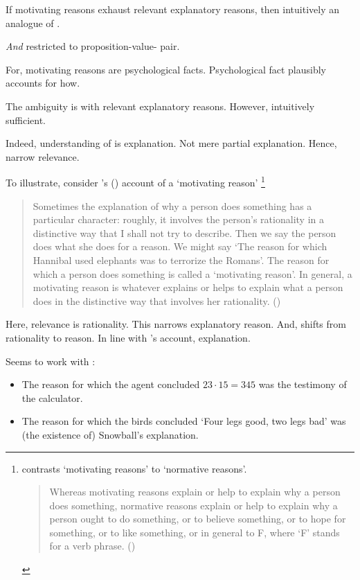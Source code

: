 \begin{note}
  If motivating reasons exhaust relevant explanatory reasons, then intuitively an analogue of \issueInclusion{}.

  {
    \color{red}
    \emph{And} restricted to proposition-value-\poP{} pair.
  }

  For, motivating reasons are psychological facts.
  Psychological fact plausibly accounts for how.

  The ambiguity is with relevant explanatory reasons.
  However, intuitively sufficient.

  Indeed, understanding of \citeauthor{Hieronymi:2011aa} is explanation.
  Not mere partial explanation.
  Hence, narrow relevance.

  To illustrate, consider \citeauthor{Broome:2013aa}'s (\citeyear{Broome:2013aa}) account of a `motivating reason'%
  \footnote{
    \citeauthor{Broome:2013aa} contrasts `motivating reasons' to `normative reasons'.
    \begin{quote}
      Whereas motivating reasons explain or help to explain why a person does something, normative reasons explain or help to explain why a person ought to do something, or to believe something, or to hope for something, or to like something, or in general to F, where ‘F' stands for a verb phrase.%
    \mbox{}\hfill\mbox{(\citeyear[47]{Broome:2013aa})}
    \end{quote}
  }
  \begin{quote}
    Sometimes the explanation of why a person does something has a particular character:
    roughly, it involves the person's rationality in a distinctive way that I shall not try to describe.
    Then we say the person does what she does for a reason.
    We might say ‘The reason for which Hannibal used elephants was to terrorize the Romans'.
    The reason for which a person does something is called a ‘motivating reason'.
    In general, a motivating reason is whatever explains or helps to explain what a person does in the distinctive way that involves her rationality.
    \mbox{}\hfill\mbox{(\citeyear[46--47]{Broome:2013aa})}
  \end{quote}

  Here, relevance is rationality.
  This narrows explanatory reason.
  And, \citeauthor{Broome:2013aa} shifts from rationality to reason.
  In line with \citeauthor{Hieronymi:2011aa}'s account, explanation.

  Seems to work with :
  \begin{itemize}
  \item
    The reason for which the agent concluded \(23 \cdot 15 = 345\) was the testimony of the calculator.
  \item
    The reason for which the birds concluded `Four legs good, two legs bad' was (the existence of) Snowball's explanation.
  \end{itemize}


\end{note}

